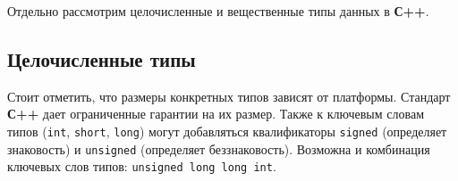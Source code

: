 Отдельно рассмотрим целочисленные и вещественные типы данных в
\textbf{С++}.

\subsection{Целочисленные
типы}\label{ux446ux435ux43bux43eux447ux438ux441ux43bux435ux43dux43dux44bux435-ux442ux438ux43fux44b}

Стоит отметить, что размеры конкретных типов зависят от платформы.
Стандарт \textbf{С++} дает ограниченные гарантии на их размер. Также к
ключевым словам типов (\texttt{int}, \texttt{short}, \texttt{long})
могут добавляться квалификаторы \texttt{signed} (определяет знаковость)
и \texttt{unsigned} (определяет беззнаковость). Возможна и комбинация
ключевых слов типов: \texttt{unsigned\ long\ long\ int}.

